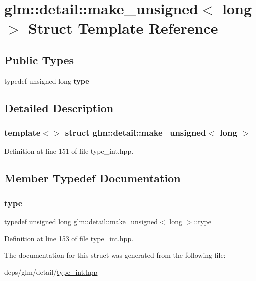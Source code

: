 \hypertarget{structglm_1_1detail_1_1make__unsigned_3_01long_01_4}{}\section{glm\+:\+:detail\+:\+:make\+\_\+unsigned$<$ long $>$ Struct Template Reference}
\label{structglm_1_1detail_1_1make__unsigned_3_01long_01_4}
\subsection*{Public Types}
\begin{DoxyCompactItemize}
\item 
\mbox{\label{structglm_1_1detail_1_1make__unsigned_3_01long_01_4_ade0cc74f63e30969e7d7b42eb6ac8289}} 
typedef unsigned long {\bfseries type}
\end{DoxyCompactItemize}


\subsection{Detailed Description}
\subsubsection*{template$<$$>$\newline
struct glm\+::detail\+::make\+\_\+unsigned$<$ long $>$}



Definition at line 151 of file type\+\_\+int.\+hpp.



\subsection{Member Typedef Documentation}
\mbox{\label{structglm_1_1detail_1_1make__unsigned_3_01long_01_4_ade0cc74f63e30969e7d7b42eb6ac8289}} 
\subsubsection{\texorpdfstring{type}{type}}
{\footnotesize\ttfamily typedef unsigned long \hyperlink{structglm_1_1detail_1_1make__unsigned}{glm\+::detail\+::make\+\_\+unsigned}$<$ long $>$\+::type}



Definition at line 153 of file type\+\_\+int.\+hpp.



The documentation for this struct was generated from the following file\+:\begin{DoxyCompactItemize}
\item 
deps/glm/detail/\hyperlink{type__int_8hpp}{type\+\_\+int.\+hpp}\end{DoxyCompactItemize}
